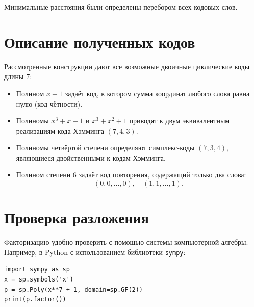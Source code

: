 \documentclass[a4paper,12pt]{article}
\begin{document}
Минимальные расстояния были определены перебором всех кодовых слов.

\section{Описание полученных кодов}

Рассмотренные конструкции дают все возможные двоичные циклические коды длины $7$:

\begin{itemize}
    \item Полином $x+1$ задаёт код, в котором сумма координат любого слова равна нулю (код чётности).
    
    \item Полиномы $x^3+x+1$ и $x^3+x^2+1$ приводят к двум эквивалентным реализациям кода Хэмминга $(7,4,3)$.
    
    \item Полиномы четвёртой степени определяют симплекс-коды $(7,3,4)$, являющиеся двойственными к кодам Хэмминга.
    
    \item Полином степени $6$ задаёт код повторения, содержащий только два слова:
    \[
    (0,0,\dots,0), \quad (1,1,\dots,1).
    \]
\end{itemize}

\section{Проверка разложения}

Факторизацию удобно проверить с помощью системы компьютерной алгебры.
Например, в Python с использованием библиотеки \texttt{sympy}:

\begin{verbatim}
import sympy as sp
x = sp.symbols('x')
p = sp.Poly(x**7 + 1, domain=sp.GF(2))
print(p.factor())
\end{verbatim}
\end{document}
